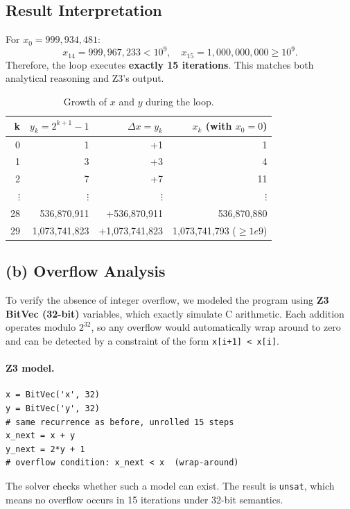 \documentclass{article}
\begin{document}
\subsection*{Result Interpretation}

For \(x_0 = 999,934,481\):
\[
x_{14} = 999,967,233 < 10^9, \quad
x_{15} = 1,000,000,000 \ge 10^9.
\]
Therefore, the loop executes \textbf{exactly 15 iterations}.
This matches both analytical reasoning and Z3's output.




\begin{table}[h]
\centering
\begin{tabular}{r|r|r|r}
\textbf{k} & \(y_k = 2^{k+1}-1\) & \(\Delta x = y_k\) & \(x_k\) (with \(x_0=0\)) \\\hline
0 & 1 & +1 & 1 \\
1 & 3 & +3 & 4 \\
2 & 7 & +7 & 11 \\
$\vdots$ & $\vdots$ & $\vdots$ & $\vdots$ \\
28 & 536,870,911 & +536,870,911 & 536,870,880 \\
29 & 1,073,741,823 & +1,073,741,823 & 1,073,741,793 ($\ge 1e9$)
\end{tabular}
\caption{Growth of \(x\) and \(y\) during the loop.}
\end{table}



\subsection*{(b) Overflow Analysis}

To verify the absence of integer overflow, we modeled the program using
\textbf{Z3 BitVec (32-bit)} variables, which exactly simulate C arithmetic.
Each addition operates modulo $2^{32}$, so any overflow would automatically
wrap around to zero and can be detected by a constraint of the form
\texttt{x[i+1] < x[i]}.

\paragraph{Z3 model.}
\begin{verbatim}
x = BitVec('x', 32)
y = BitVec('y', 32)
# same recurrence as before, unrolled 15 steps
x_next = x + y
y_next = 2*y + 1
# overflow condition: x_next < x  (wrap-around)
\end{verbatim}

The solver checks whether such a model can exist. The result is \texttt{unsat},
which means no overflow occurs in 15 iterations under 32-bit semantics.
\end{document}
